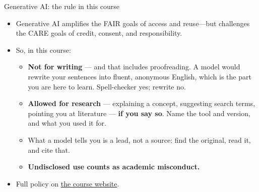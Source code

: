 \documentclass[aspectratio=169]{beamer}
\begin{document}
\begin{frame}{Generative AI: the rule in this course}
\begin{itemize}
  \item Generative AI amplifies the FAIR goals of access and reuse—but
    challenges the CARE goals of credit, consent, and responsibility.
  \item So, in this course:
    \begin{itemize}
      \item \textbf{Not for writing} --- and that includes proofreading.
        A model would rewrite your sentences into fluent, anonymous English,
        which is the part you are here to learn.  Spell-checker yes; rewrite
        no.
      \item \textbf{Allowed for research} --- explaining a concept, suggesting
        search terms, pointing you at literature --- \textbf{if you say so}.
        Name the tool and version, and what you used it for.
      \item What a model tells you is a lead, not a source: find the original,
        read it, and cite that.
      \item \textbf{Undisclosed use counts as academic misconduct.}
    \end{itemize}
  \item Full policy on
    \href{https://bond-lab.github.io/Open-Knowledge/}{the course website}.
\end{itemize}
\end{frame}
\end{document}
